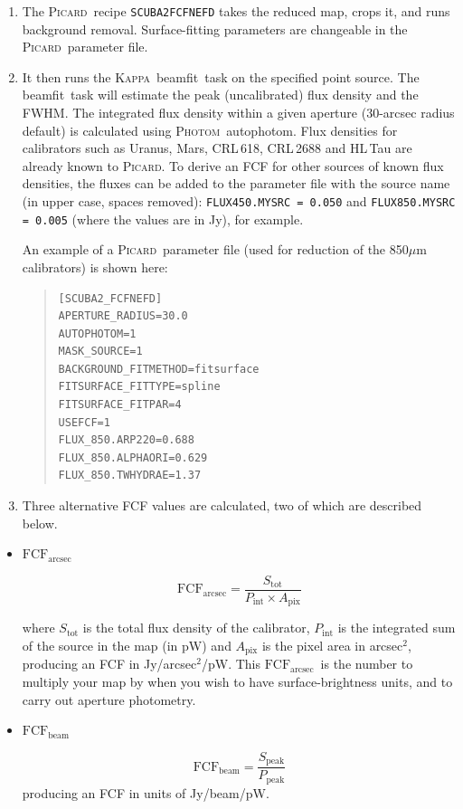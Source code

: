 \documentclass[twoside,11pt]{article}
\newcommand{\xref}[3]{#1}
\renewcommand{\_}{\texttt{\symbol{95}}}
\newenvironment{myquote}{\begin{quote}\begin{small}}{\end{small}\end{quote}}
\newcommand{\fcfb}{$\mathrm{FCF_{beam}}$}
\newcommand{\fcfa}{$\mathrm{FCF_{arcsec}}$}
\newcommand{\Kappa}{\xref{\textsc{Kappa}}{sun95}{}}
\newcommand{\photom}{\xref{\textsc{Photom}}{sun45}{}}
\newcommand{\picard}{\xref{\textsc{Picard}}{sun265}{}}
\newcommand{\drrecipe}[1]{\texttt{#1}}
\newcommand{\task}[1]{\textsf{#1}}
\newcommand{\beamfit}{\xref{\task{beamfit}}{sun95}{BEAMFIT}}
\newcommand{\autophotom}{\xref{\task{autophotom}}{sun45}{AUTOPHOTOM}}
\begin{document}
\begin{enumerate}
\item{The \picard\ recipe \drrecipe{SCUBA2\_FCFNEFD} takes the reduced
  map, crops it, and runs background removal. Surface-fitting
  parameters are changeable in the \picard\ parameter file.}
\item{It then runs the \Kappa\ \beamfit\ task on the specified point
  source. The \beamfit\ task will estimate the peak (uncalibrated)
  flux density and the FWHM. The integrated flux density within a
  given aperture (30-arcsec radius default) is calculated using
  \photom\ \autophotom. Flux densities for calibrators such as Uranus,
  Mars, CRL\,618, CRL\,2688 and HL\,Tau are already known to
  \picard. To derive an FCF for other sources of known flux densities,
  the fluxes can be added to the parameter file with the source name
  (in upper case, spaces removed): \texttt{FLUX\_450.MYSRC = 0.050}
  and \texttt{FLUX\_850.MYSRC = 0.005} (where the values are in Jy),
  for example. }

  An example of a \picard\ parameter file (used for reduction of the
  850$\mu$m calibrators) is shown here:

\begin{myquote}
\begin{verbatim}
[SCUBA2_FCFNEFD]
APERTURE_RADIUS=30.0
AUTOPHOTOM=1
MASK_SOURCE=1
BACKGROUND_FITMETHOD=fitsurface
FITSURFACE_FITTYPE=spline
FITSURFACE_FITPAR=4
USEFCF=1
FLUX_850.ARP220=0.688
FLUX_850.ALPHAORI=0.629
FLUX_850.TWHYDRAE=1.37
\end{verbatim}
\end{myquote}

\item {Three alternative FCF values are calculated, two of which are
described below.}
\end{enumerate}

\begin{itemize}

\item{\textbf{\fcfa}}

\begin{equation}
\label{eq:fcf_arcsec}
\mathrm{FCF_{arcsec}} = \frac{S_\mathrm{tot}}{P_\mathrm{int} \times
  A_\mathrm{pix}}
\end{equation}

where $S_\mathrm{tot}$ is the total flux density of the calibrator,
$P_\mathrm{int}$ is the integrated sum of the source in the map (in
pW) and $A_\mathrm{pix}$ is the pixel area in arcsec$^2$, producing an
FCF in Jy/arcsec$^2$/pW. This \fcfa\ is the number to
multiply your map by when you wish to have surface-brightness units,
and to carry out aperture photometry.

\item{\textbf{\fcfb}}

\begin{equation}
\label{eq:fcf_beam}
\mathrm{FCF_{beam}} = \frac{S_\mathrm{{peak}}}{P_\mathrm{peak}}
\end{equation}
producing an FCF in units of Jy/beam/pW.
\end{itemize}
\end{document}
